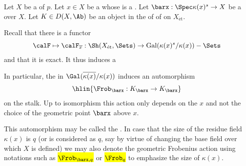 \begin{definition} \label{definition:geometric_frobenius_action_of_a_derived_object_on_a_scheme_of_characteristic_p_at_a_stalk}
    Let $X$ be a  of  $p$. Let $x \in X$ be a  whose  is a . Let $\barx: \Spec \kappa(x)^s \to X$ be a  over $X$.
    Let $K \in D(X, \Ab)$ be an object in the  of  of  on $X_{\mathrm{\acute{e}t}}$. 

    Recall that there is a  functor 
    $$\calF \mapsto \calF_{\overline{x}}: \Sh(X_{\text{ét}}, \Sets) \to \operatorname{Gal}(\kappa(x)^s / \kappa(x))-\Sets$$
    and that it is exact. It thus induces a 

    In particular, the  in $\Gal(\overline{\kappa(x)} / \kappa(x))$ induces an automorphism 
    $$\hlin{\Frob_{\barx}: K_{\barx} \to K_{\barx}}$$
    on the stalk. Up to isomorphism this action only depends on the  $x$ and not the choice of the geometric point $\barx$ above $x$.
    

    This automorphism may be called the . In case that the size of the residue field $\kappa(x)$ is $q$ (or is considered as $q$, say by virtue of changing the base field over which $X$ is defined) we may also denote the geometric Frobenius action using notations such as \hl{$\Frob_{\barx, q}$} or \hl{$\Frob_{q}$} to emphasize the size of $\kappa(x)$.
\end{definition}
